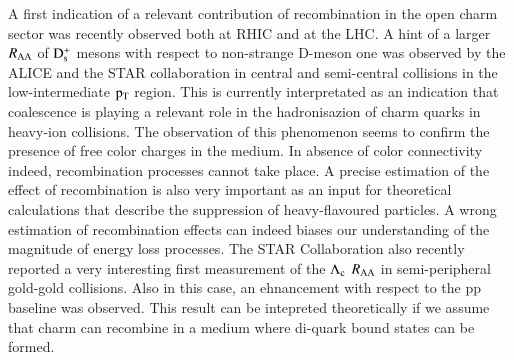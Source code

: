 \documentclass{webofc}
\begin{document}
A first indication of a relevant contribution of recombination in the open charm sector was recently observed both at RHIC and at the LHC. A hint of a larger $R_{\mathrm{AA}}$ of $\rm D_{s}^{+}$ mesons with respect to non-strange 
D-meson one was observed by the ALICE and the STAR collaboration in central and semi-central collisions in the low-intermediate $\rm p_{\rm T} $ region. This is currently interpretated as an indication that coalescence is playing 
a relevant role in the hadronisazion of charm quarks in heavy-ion collisions. The observation of this phenomenon seems to confirm the presence of free color charges in the medium. 
In absence of color connectivity indeed, recombination processes cannot take place. A precise estimation of the effect of 
recombination is also very important as an input for theoretical calculations that describe the suppression of heavy-flavoured particles. A wrong estimation of recombination effects can indeed 
biases our understanding of the magnitude of energy loss processes. The STAR Collaboration also recently reported a very interesting first measurement of the $\rm \Lambda_{c}$ 
$R_{\mathrm{AA}}$ in semi-peripheral gold-gold collisions. Also in this case, an ehnancement with respect to the pp baseline was observed. This result can be intepreted theoretically if we assume that charm 
can recombine in a medium where  di-quark bound states can be formed. 
\end{document}
